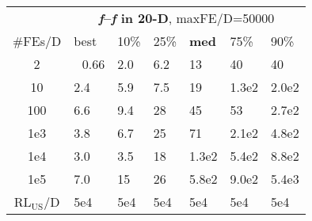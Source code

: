 \begin{tabular}{c|llllll}
 & \multicolumn{6}{|c}{\textbf{\textit{f}\raisebox{-0.35ex}{1}--\textit{f}\raisebox{-0.35ex}{24} in 20-D}, maxFE/D=50000}\\
\#FEs/D & best & 10\% & 25\% & \textbf{med} & 75\% & 90\%\\
2 & ~\,0.66 & \hspace*{1ex}2.0 & \hspace*{1ex}6.2 & 13 & 40 & 40\\
10 & \hspace*{1ex}2.4 & \hspace*{1ex}5.9 & \hspace*{1ex}7.5 & 19 & 1.3e2 & 2.0e2\\
100 & \hspace*{1ex}6.6 & \hspace*{1ex}9.4 & 28 & 45 & 53 & 2.7e2\\
1e3 & \hspace*{1ex}3.8 & \hspace*{1ex}6.7 & 25 & 71 & 2.1e2 & 4.8e2\\
1e4 & \hspace*{1ex}3.0 & \hspace*{1ex}3.5 & 18 & 1.3e2 & 5.4e2 & 8.8e2\\
1e5 & \hspace*{1ex}7.0 & 15 & 26 & 5.8e2 & 9.0e2 & 5.4e3\\
$\text{RL}_{\text{US}}$/D & 5e4 & 5e4 & 5e4 & 5e4 & 5e4 & 5e4
\end{tabular}
